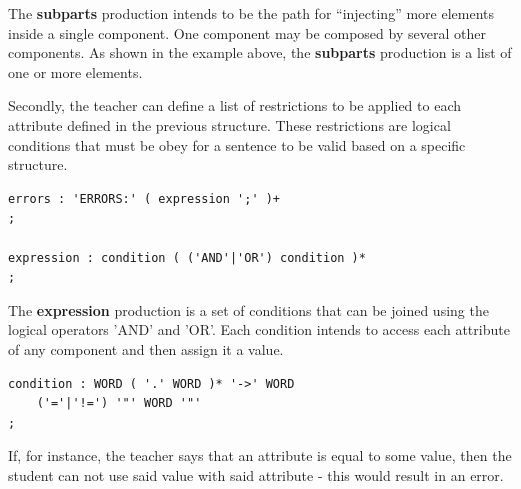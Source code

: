 The \textbf{subparts} production intends to be the path for ``injecting'' more elements inside a single component. One component may be composed by several other components. As shown in the example above, the \textbf{subparts} production is a list of one or more elements.

Secondly, the teacher can define a list of restrictions to be applied to each attribute defined in the previous structure. These restrictions are logical conditions that must be obey for a sentence to be valid based on a specific structure.


\begin{center}
\begin{minipage}{12cm}
\begin{Verbatim}[frame=single, framesep=2mm]
errors : 'ERRORS:' ( expression ';' )+
;

expression : condition ( ('AND'|'OR') condition )*
;
\end{Verbatim}
\end{minipage}
\end{center}


The \textbf{expression} production is a set of conditions that can be joined using the logical operators 'AND' and 'OR'. Each condition intends to access each attribute of any component and then assign it a value.

\begin{center}
\begin{minipage}{10cm}
\begin{Verbatim}[frame=single, framesep=2mm]
condition : WORD ( '.' WORD )* '->' WORD 
    ('='|'!=') '"' WORD '"'
;
\end{Verbatim}
\end{minipage}
\end{center}


If, for instance, the teacher says that an attribute is equal to some value, then the student can not use said value with said attribute - this would result in an error.

